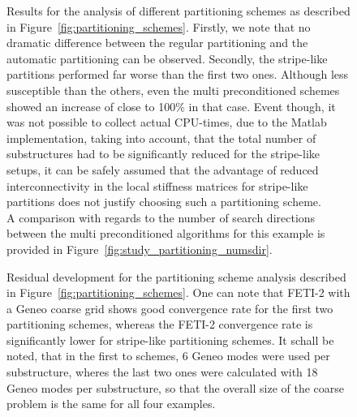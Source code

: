 \begin{figure}[tb]
  \begin{center}
    
    \caption[Study of partitioning schemes: \# iterations]{Results for the analysis of different partitioning schemes as described in Figure~\ref{fig:partitioning_schemes}. Firstly, we note that no dramatic difference between the regular partitioning and the automatic partitioning can be observed. Secondly, the stripe-like partitions performed far worse than the first two ones. Although less susceptible than the others, even the multi preconditioned schemes showed an increase of close to 100\% in that case. Event though, it was not possible to collect actual CPU-times, due to the Matlab implementation, taking into account, that the total number of substructures had to be significantly reduced for the stripe-like setups, it can be safely assumed that the advantage of reduced interconnectivity in the local stiffness matrices for stripe-like partitions does not justify choosing such a partitioning scheme.\\
      A comparison with regards to the number of search directions between the multi preconditioned algorithms for this example is provided in Figure~\ref{fig:study_partitioning_numsdir}. }
    \label{fig:study_partitioning_numiter}
  \end{center}
\end{figure}


\begin{figure}
  \begin{center}
    
    \caption[Study of partitioning schemes: residua]{Residual development for the partitioning scheme analysis described in Figure~\ref{fig:partitioning_schemes}. One can note that FETI-2 with a Geneo coarse grid shows good convergence rate for the first two partitioning schemes, whereas the FETI-2 convergence rate is significantly lower for stripe-like partitioning schemes. It schall be noted, that in the first to schemes, 6 Geneo modes were used per substructure, wheres the last two ones were calculated with 18 Geneo modes per substructure, so that the overall size of the coarse problem is the same for all four examples.}
    \label{fig:study_partitioning_residual}
  \end{center}
\end{figure}

